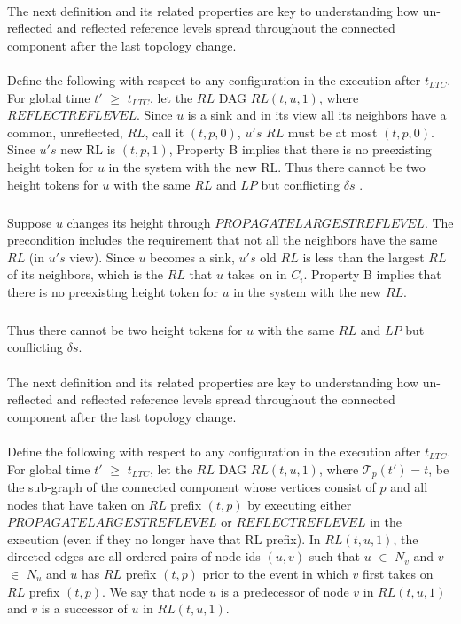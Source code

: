 \paragraph{}The next definition and its related properties are key to understanding how un- reflected and reflected reference levels spread throughout the connected component after the last topology change.
\paragraph{}Define the following with respect to any configuration in the execution after $t_{LTC}$. For global time $t'$ $\geq$ $t_{LTC}$, let the $RL$ DAG $RL (t, u, 1)$, where $REFLECTREFLEVEL$. Since $u$ is a sink and in its view all its neighbors have a common, unreflected, $RL$, call it $(t, p, 0)$, $u's$ $RL$ must be at most $(t, p, 0)$. Since $u's$ new RL is $(t, p, 1)$, Property B implies that there is no preexisting height token for $u$ in the system with the new RL. Thus there cannot be two height tokens for $u$ with the same $RL$ and $LP$ but conflicting $\delta s$ . 
\subparagraph{}Suppose $u$ changes its height through $PROPAGATELARGESTREFLEVEL$. The precondition includes the requirement that not all the neighbors have the same $RL$ (in $u's$ view). Since $u$ becomes a sink, $u's$ old $RL$ is less than the largest $RL$ of its neighbors, which is the $RL$ that $u$ takes on in $C_i$. Property B implies that there is no preexisting height token for $u$ in the system with the new $RL$. 
\subparagraph{}Thus there cannot be two height tokens for $u$ with the same $RL$ and $LP$ but conflicting $\delta s$.

\paragraph{}The next definition and its related properties are key to understanding how un-reflected and reflected reference levels spread throughout the connected component after the last topology change.
\paragraph{}Define the following with respect to any configuration in the execution after $t_{LTC}$. For global time $t'$ $\geq$ $t_{LTC}$, let the $RL$ DAG $RL (t, u, 1)$, where $\mathcal{T}_p(t ' ) = t$, be the sub-graph of the connected component whose vertices consist of $p$ and all nodes that have taken on $RL$ prefix $(t, p)$ by executing either $PROPAGATELARGESTREFLEVEL$ or $REFLECTREFLEVEL$ in the execution (even if they no longer have that RL prefix). In $RL (t, u, 1)$, the directed edges are all ordered pairs of node ids $(u, v)$ such that $u$ $\in$ $N_v$ and $v$ $\in$ $N_u$ and $u$ has $RL$ prefix $(t, p)$ prior to the event in which $v$ first takes on $RL$ prefix $(t, p)$. We say that node $u$ is a predecessor of node $v$ in $RL (t, u, 1)$ and $v$ is a successor of $u$ in $RL (t, u, 1)$.

